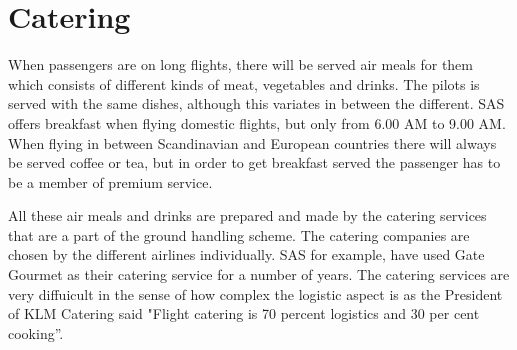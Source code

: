 \section{Catering} 
When passengers are on long flights, there will be served air meals for them which consists of different kinds of meat, vegetables and drinks. The pilots is served with the same dishes, although this variates in between the different\cite{cate_pilotfood1}\cite{cate_pilotfood2}. SAS offers breakfast when flying domestic flights, but only from 6.00 AM to 9.00 AM\cite{cate_SASIndri}. When flying in between Scandinavian and European countries there will always be served coffee or tea, but in order to get breakfast served the passenger has to be a member of premium service\cite{cate_SASscanda}.

All these air meals and drinks are prepared and made by the catering services that are a part of the ground handling scheme. The catering companies are chosen by the different airlines individually. SAS for example, have used Gate Gourmet\cite{cate_SASGourmet} as their catering service for a number of years. The catering services are very diffuicult in the sense of how complex the logistic aspect is as the President of KLM Catering said "Flight catering is 70 
percent logistics and 30 per cent cooking”\cite{cate_BookSection}.